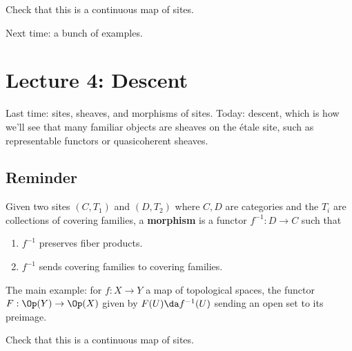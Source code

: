 \begin{exercise}[?]

Check that this is a continuous map of sites.

\end{exercise}

Next time: a bunch of examples.

\hypertarget{lecture-4-descent}{%
\section{Lecture 4: Descent}\label{lecture-4-descent}}

Last time: sites, sheaves, and morphisms of sites. Today: descent, which
is how we'll see that many familiar objects are sheaves on the étale
site, such as representable functors or quasicoherent sheaves.

\hypertarget{reminder}{%
\subsection{Reminder}\label{reminder}}

\begin{definition}

Given two sites \((C, T_1)\) and \((D, T_2)\) where \(C, D\) are
categories and the \(T_i\) are collections of covering families, a
\textbf{morphism} is a functor \(f^{-1} :D\to C\) such that

\begin{enumerate}
\def\labelenumi{\arabic{enumi}.}
\tightlist
\item
  \(f^{-1}\) preserves fiber products.
\item
  \(f^{-1}\) sends covering families to covering families.
\end{enumerate}

\end{definition}

\begin{example}[?]

The main example: for \(f:X\to Y\) a map of topological spaces, the
functor \(F: \Op(Y) \to \Op(X)\) given by \(F(U) \da f^{-1}(U)\) sending
an open set to its preimage.

\end{example}

\begin{exercise}[Check!]

Check that this is a continuous map of sites.

\end{exercise}

